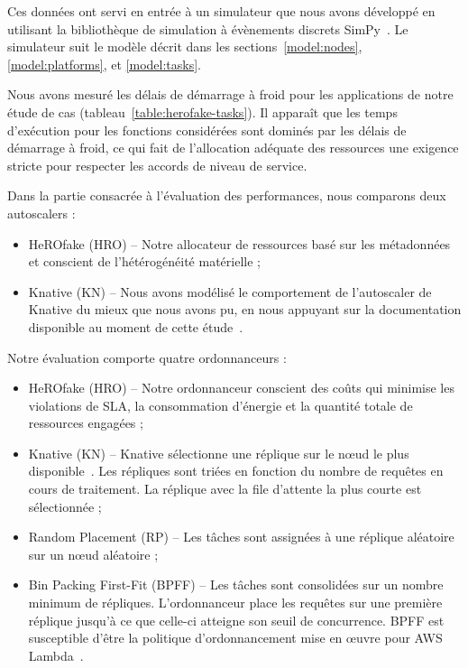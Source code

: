Ces données ont servi en entrée à un simulateur que nous avons développé en utilisant la bibliothèque de simulation à évènements discrets SimPy~\cite{simpy}. Le simulateur suit le modèle décrit dans les sections~\ref{model:nodes}, \ref{model:platforms}, et \ref{model:tasks}.

Nous avons mesuré les délais de démarrage à froid pour les applications de notre étude de cas (tableau~\ref{table:herofake-tasks}). Il apparaît que les temps d'exécution pour les fonctions considérées sont dominés par les délais de démarrage à froid, ce qui fait de l'allocation adéquate des ressources une exigence stricte pour respecter les accords de niveau de service.

Dans la partie consacrée à l'évaluation des performances, nous comparons deux autoscalers :

\begin{itemize}
    \item HeROfake (HRO) -- Notre allocateur de ressources basé sur les métadonnées et conscient de l'hétérogénéité matérielle ;
    \item Knative (KN) -- Nous avons modélisé le comportement de l'autoscaler de Knative du mieux que nous avons pu, en nous appuyant sur la documentation disponible au moment de cette étude~\cite{knative-autoscaling}.
\end{itemize}

Notre évaluation comporte quatre ordonnanceurs :

\begin{itemize}
    \item HeROfake (HRO) -- Notre ordonnanceur conscient des coûts qui minimise les violations de SLA, la consommation d'énergie et la quantité totale de ressources engagées ;
    \item Knative (KN) -- Knative sélectionne une réplique sur le nœud le plus disponible~\cite{sureshENSUREEfficientScheduling2020}. Les répliques sont triées en fonction du nombre de requêtes en cours de traitement. La réplique avec la file d'attente la plus courte est sélectionnée ;
    \item Random Placement (RP) -- Les tâches sont assignées à une réplique aléatoire sur un nœud aléatoire ;
    \item Bin Packing First-Fit (BPFF) -- Les tâches sont consolidées sur un nombre minimum de répliques. L'ordonnanceur place les requêtes sur une première réplique jusqu'à ce que celle-ci atteigne son seuil de concurrence. BPFF est susceptible d'être la politique d'ordonnancement mise en œuvre pour AWS Lambda~\cite{wangPeekingCurtainsServerlessb}.
\end{itemize}

